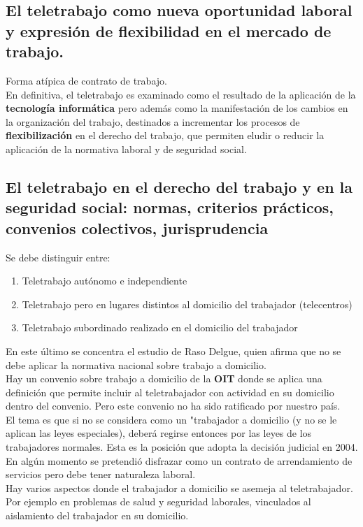 \documentclass[spanish,12pt,a4paper,titlepage]{report}
\begin{document}
\subsection{El teletrabajo como nueva oportunidad laboral y expresión de flexibilidad en el mercado de trabajo.}
Forma atípica de contrato de trabajo.\\

En definitiva, el teletrabajo es examinado como el resultado de la aplicación de la \textbf{tecnología informática} pero además como la manifestación de los cambios en la organización del trabajo, destinados a incrementar los procesos de \textbf{flexibilización} en el derecho del trabajo, que permiten eludir o reducir la aplicación de la normativa laboral y de seguridad social.

\subsection{El teletrabajo en el derecho del trabajo y en la seguridad social: normas, criterios prácticos, convenios colectivos, jurisprudencia}
Se debe distinguir entre:
\begin{enumerate}
	\item Teletrabajo autónomo e independiente
	\item Teletrabajo pero en lugares distintos al domicilio del trabajador (telecentros)
	\item Teletrabajo subordinado  realizado en el domicilio del trabajador
\end{enumerate}
En este último se concentra el estudio de Raso Delgue, quien afirma que no se debe aplicar la normativa nacional sobre trabajo a domicilio.\\

Hay un convenio sobre trabajo a domicilio de la \textbf{OIT} donde se aplica una definición que permite incluir al teletrabajador con actividad en su domicilio dentro del convenio. Pero este convenio no ha sido ratificado por nuestro país.\\

El tema es que si no se considera como un "trabajador a domicilio (y no se le aplican las leyes especiales), deberá regirse entonces por las leyes de los trabajadores normales. Esta es la posición que adopta la decisión judicial en 2004. En algún momento se pretendió disfrazar como un contrato de arrendamiento de servicios pero debe tener naturaleza laboral.\\

Hay varios aspectos donde el trabajador a domicilio se asemeja al teletrabajador. Por ejemplo en problemas de salud y seguridad laborales, vinculados al aislamiento del trabajador en su domicilio.\\
\end{document}
